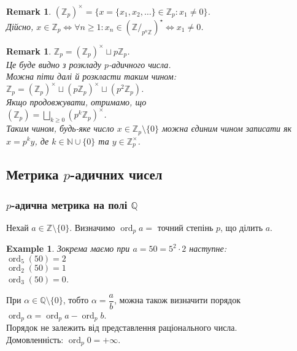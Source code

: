 \documentclass[a4paper, 14pt]{extarticle}
\theoremstyle{theoremdd}
\theoremstyle{theoremdd}
\theoremstyle{theoremdd}
\theoremstyle{theoremdd}
\newtheorem{example}[theorem]{Example}
\theoremstyle{theoremdd}
\theoremstyle{theoremdd}
\newtheorem{remark}[theorem]{Remark}
\theoremstyle{theoremdd}
\theoremstyle{theoremdd}
\DeclareMathOperator{\ord}{ord}
\begin{document}
\begin{remark}
$(\mathbb{Z}_p)^\times = \{ x = \{x_1,x_2,\dots\} \in \mathbb{Z}_p : x_1 \neq 0\}$.\\
Дійсно, $x \in \mathbb{Z}_p \iff \forall n \geq 1: x_n \in (\mathbb{Z}/_{p^n \mathbb{Z}})^\star \iff x_1 \neq 0$.
\end{remark}

\begin{remark}
$\mathbb{Z}_p = (\mathbb{Z}_p)^\times \sqcup p \mathbb{Z}_p$.\\
Це буде видно з розкладу $p$-адичного числа.
\bigskip \\
Можна піти далі й розкласти таким чином:\\
$\mathbb{Z}_p = (\mathbb{Z}_p)^\times \sqcup (p \mathbb{Z}_p)^\times \sqcup (p^2 \mathbb{Z}_p)$.\\
Якщо продовжувати, отримамо, що\\
$(\mathbb{Z}_p) = \displaystyle\bigsqcup_{k \geq 0} (p^k \mathbb{Z}_p)^\times$.\\
Таким чином, будь-яке число $x \in \mathbb{Z}_p \setminus \{0\}$ можна єдиним чином записати як $x = p^k y$, де $k \in \mathbb{N} \cup \{0\}$ та $y \in \mathbb{Z}_p^\times$.
\end{remark}

\subsection{Метрика $p$-адичних чисел}
\subsubsection*{$p$-адична метрика на полі $\mathbb{Q}$}
Нехай $a \in \mathbb{Z} \setminus \{0\}$. Визначимо $\ord_p a = $ точний степінь $p$, що ділить $a$.

\begin{example}
Зокрема маємо при $a = 50 = 5^2 \cdot 2$ наступне:\\
$\ord_5(50) = 2$\\
$\ord_2(50) = 1$\\
$\ord_3(50) = 0$.
\end{example}

При $\alpha \in \mathbb{Q} \setminus \{0\}$, тобто $\alpha = \dfrac{a}{b}$, можна також визначити порядок $\ord_p \alpha = \ord_p a - \ord_p b$.\\
Порядок не залежить від представлення раціонального числа.
\bigskip \\
Домовленність: $\ord_p 0 = +\infty$.
\end{document}
